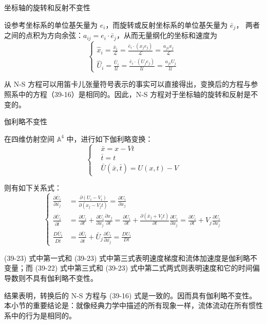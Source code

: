 \documentclass[12pt, a4paper, oneside, UTF8]{ctexbook}  %
\begin{document}
\begin{proposition}
    坐标轴的旋转和反射不变性

    设参考坐标系的单位基矢量为 \( e_i \)，而旋转或反射坐标系的单位基矢量为 \( \bar{e}_j \)，
    两者之间的点积为方向余弦：\( a_{ij} = e_i \cdot \bar{e}_j \)，从而无量纲化的坐标和速度为
\[
\begin{cases}
\hat{x}_i = \frac{\bar{x}_i}{\mathcal{L}} = \frac{\bar{e}_i \cdot (x_j e_j)}{\mathcal{L}} = \frac{a_{ji} x_j}{\mathcal{L}} \\
\hat{U}_i = \frac{\bar{U}_i}{\mathcal{U}} = \frac{\bar{e}_i \cdot (U_j e_j)}{\mathcal{U}} = \frac{a_{ji} U_j}{\mathcal{U}}
\end{cases}
\tag{39-21}
\]

从 N-S 方程可以用笛卡儿张量符号表示的事实可以直接得出，变换后的方程与参照系中的方程（39-16）是相同的。因此，N-S 方程对于坐标轴的旋转和反射是不变的。
\end{proposition}
\begin{proposition}
    伽利略不变性
    
    在四维仿射空间 \( \mathbb{A}^4 \) 中，进行如下伽利略变换：
\[
\left\{
\begin{aligned}
    &\bar{x} = x - Vt \\
    &\bar{t} = t\\
    &\bar{U}(\bar{x}, \bar{t}) = U(x, t) - V
\end{aligned}
\right.
\tag{39-22}
\]

则有如下关系式：
\[
\left\{
\begin{aligned}
    \frac{\partial \bar{U}_i}{\partial \bar{x_j}} &= \frac{\partial (U_i - V_i)}{\partial (x_j - V_jt)} = \frac{\partial U_i}{\partial x_j} \\
    \frac{\partial \bar{U}_i}{\partial \bar{t}} &= \frac{\partial U_i}{\partial t} + \frac{\partial U_i}{\partial x_j} \frac{\partial x_j}{\partial t} = \frac{\partial U_i}{\partial t} + \frac{\partial (\bar{x}_j + V_j t)}{\partial t} \frac{\partial U_i}{\partial x_j} = \frac{\partial U_i}{\partial t} + V_j \frac{\partial U_i}{\partial x_j} \\
    \frac{D \bar{U}_i}{D \bar{t}} &= \frac{\partial \bar{U}_i}{\partial \bar{t}} + \bar{U}_j \frac{\partial \bar{U}_i}{\partial \bar{x_j}} = \frac{D U_i}{D t}
\end{aligned}
\right.
\tag{39-23}
\]

(39-23) 式中第一式和 (39-23) 式中第三式表明速度梯度和流体加速度是伽利略不变量；而 (39-22) 式中第三式和 (39-23) 式中第二式两式则表明速度和它的时间偏导数则不具有伽利略不变性。

结果表明，转换后的 N-S 方程与 (39-16) 式是一致的。因而具有伽利略不变性。本小节的重要结论是：就像经典力学中描述的所有现象一样，流体流动在所有惯性系中的行为是相同的。
\end{proposition}
\end{document}
